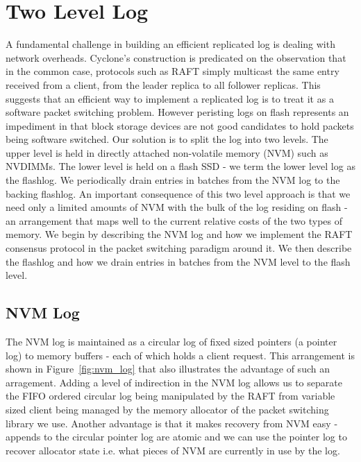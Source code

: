 \documentclass[10pt, preprint, nonatbib]{sigplanconf}
\begin{document}
\section{Two Level Log}
\label{sec:2level}
A fundamental challenge in building an efficient replicated log is dealing with
network overheads. Cyclone's construction is predicated on the observation that
in the common case, protocols such as RAFT simply multicast the same entry
received from a client, from the leader replica to all follower replicas. This
suggests that an efficient way to implement a replicated log is to treat it as a
software packet switching problem. However peristing logs on flash represents an
impediment in that block storage devices are not good candidates to hold packets
being software switched. Our solution is to split the log into two levels. The
upper level is held in directly attached non-volatile memory (NVM)
such as NVDIMMs. The lower level is held on a flash SSD - we term the lower
level log as the flashlog. We periodically drain entries in batches from the NVM
log to the backing flashlog. An important consequence of this two level approach
is that we need only a limited amounts of NVM with the bulk of the log residing
on flash - an arrangement that maps well to the current relative costs of the
two types of memory. We begin by describing the NVM log and how we implement the
RAFT consensus protocol in the packet switching paradigm around it. We then
describe the flashlog and how we drain entries in batches from the NVM level to
the flash level.

\subsection{NVM Log}
The NVM log is maintained as a circular log of fixed sized pointers (a pointer
log) to memory buffers - each of which holds a client request. This arrangement
is shown in Figure~\ref{fig:nvm_log} that also illustrates the advantage of such
an arragement. Adding a level of indirection in the NVM log allows us to
separate the FIFO ordered circular log being manipulated by the RAFT from
variable sized client being managed by the memory allocator of the packet
switching library we use. Another advantage is that it makes recovery from NVM
easy - appends to the circular pointer log are atomic and we can use the pointer
log to recover allocator state i.e. what pieces of NVM are currently in use by
the log.
\end{document}
